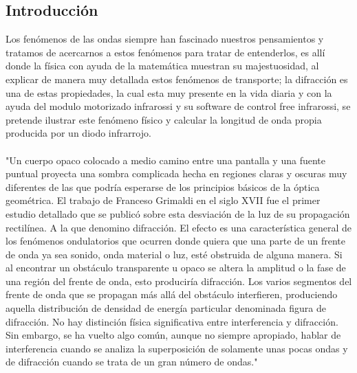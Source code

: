 \documentclass[12]{article}
\begin{document}
\begin{multicols}{2}
\section{Introducción}
Los fenómenos de las ondas siempre han fascinado nuestros pensamientos y tratamos de acercarnos a estos fenómenos para tratar de entenderlos, es allí donde la física con ayuda de la matemática muestran su majestuosidad, al explicar de manera muy detallada estos fenómenos de transporte; la difracción es una de estas propiedades, la cual esta muy presente en la vida diaria y con la ayuda del modulo motorizado infrarossi y su software de control free infrarossi, se pretende ilustrar este fenómeno físico y calcular la longitud de onda propia producida por un diodo infrarrojo. \\ \\
"Un cuerpo opaco colocado a medio camino entre una pantalla y una fuente puntual proyecta una sombra complicada hecha en regiones claras y oscuras muy diferentes de las que podría esperarse de los principios básicos de la óptica geométrica. El trabajo de Franceso Grimaldi en el siglo XVII fue el primer estudio detallado que se publicó sobre esta desviación de la luz de su propagación rectilínea. A la que denomino difracción. El efecto es una característica general de los fenómenos ondulatorios que ocurren donde quiera que una parte de un frente de onda ya sea sonido, onda material o luz, esté obstruida de alguna manera. Si al encontrar un obstáculo transparente u opaco se altera la amplitud o la fase de una región del frente de onda, esto produciría difracción. Los varios segmentos del frente de onda que se propagan más allá del obstáculo interfieren, produciendo aquella distribución de densidad de energía particular denominada figura de difracción. No hay distinción física significativa entre interferencia y difracción. Sin embargo, se ha vuelto algo común, aunque no siempre apropiado, hablar de interferencia cuando se analiza la superposición de solamente unas pocas ondas y de difracción cuando se trata de un gran número de ondas."\cite{OPTICA}


\end{multicols}
\end{document}
